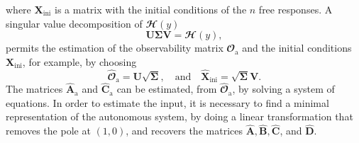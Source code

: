 where $\mathbf{X}_\text{ini}$ is a matrix with the initial conditions of the $n$ free responses. 
A singular value decomposition of $\mathbfcal{H}({y})$ 
\begin{equation} \mathbf{U} \bm{\Sigma} \mathbf{V} = \mathbfcal{H}({y}), \end{equation}
permits the estimation of the observability matrix $\mathbfcal{O}_\text{a}$ and the initial conditions $\mathbf{X}_\text{ini}$, for example, by choosing
\begin{equation} \widehat{\mathbfcal{O}}_\text{a} = \mathbf{U} \sqrt{\bm{\Sigma}}, \quad \text{and} \quad \widehat{\mathbf{X}}_\text{ini} = \sqrt{\bm{\Sigma}} \mathbf{V} . \end{equation}
The matrices $\widehat{\mathbf{A}}_\text{a}$ and $\widehat{\mathbf{C}}_\text{a}$ can be estimated, from $\widehat{\mathbfcal{O}}_\text{a}$, by solving a system of equations.
In order to estimate the input, it is necessary to find a minimal representation of the autonomous system, by doing a linear transformation that removes the pole at $(1,0)$, and recovers the matrices $\widehat{\mathbf{A}}, \widehat{\mathbf{B}}, \widehat{\mathbf{C}}$, and $\widehat{\mathbf{D}}$.  



